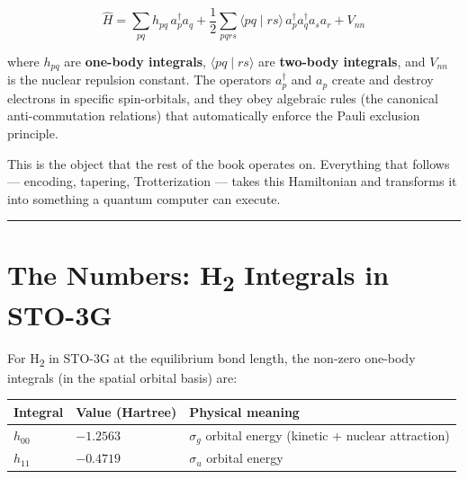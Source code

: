 \documentclass[
  11pt,
  oneside]{book}
\begin{document}
\[\hat{H} = \sum_{pq} h_{pq}\, a_p^\dagger a_q + \frac{1}{2}\sum_{pqrs} \langle pq \mid rs\rangle\, a_p^\dagger a_q^\dagger a_s a_r + V_{nn}\]

where \(h_{pq}\) are \textbf{one-body integrals},
\(\langle pq \mid rs\rangle\) are \textbf{two-body integrals}, and
\(V_{nn}\) is the nuclear repulsion constant. The operators
\(a_p^\dagger\) and \(a_p\) create and destroy electrons in specific
spin-orbitals, and they obey algebraic rules (the canonical
anti-commutation relations) that automatically enforce the Pauli
exclusion principle.

This is the object that the rest of the book operates on. Everything
that follows --- encoding, tapering, Trotterization --- takes this
Hamiltonian and transforms it into something a quantum computer can
execute.

\begin{center}\rule{0.5\linewidth}{0.5pt}\end{center}

\section{The Numbers: H\textsubscript{2} Integrals in
STO-3G}\label{the-numbers-hux2082-integrals-in-sto-3g}

For H\textsubscript{2} in STO-3G at the equilibrium bond length, the non-zero one-body
integrals (in the spatial orbital basis) are:

\begin{longtable}[]{@{}
  >{\centering\arraybackslash}p{}
  >{\centering\arraybackslash}p{}
  >{\raggedright\arraybackslash}p{}@{}}
\toprule\noalign{}
\begin{minipage}[b]{\linewidth}\centering
Integral
\end{minipage} & \begin{minipage}[b]{\linewidth}\centering
Value (Hartree)
\end{minipage} & \begin{minipage}[b]{\linewidth}\raggedright
Physical meaning
\end{minipage} \\
\midrule\noalign{}
\endhead
\bottomrule\noalign{}
\endlastfoot
\(h_{00}\) & \(-1.2563\) & \(\sigma_g\) orbital energy (kinetic +
nuclear attraction) \\
\(h_{11}\) & \(-0.4719\) & \(\sigma_u\) orbital energy \\
\end{longtable}
\end{document}
